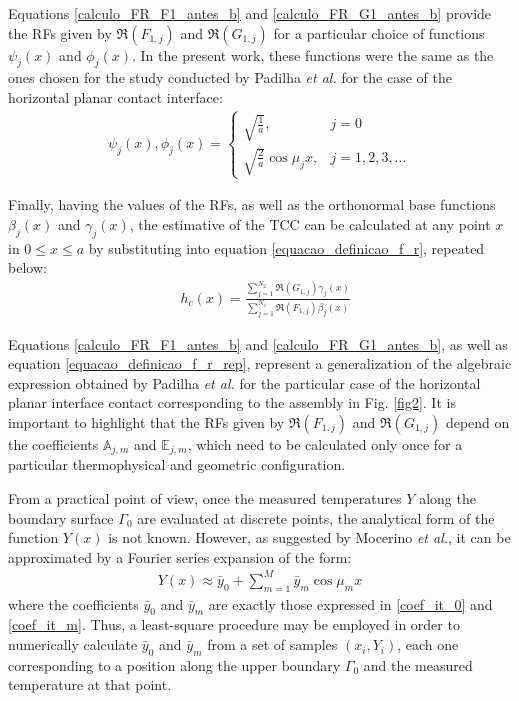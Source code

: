 \documentclass[conference,compsoc,fleqn]{IEEEtran}
\begin{document}
Equations \eqref{calculo_FR_F1_antes_b} and \eqref{calculo_FR_G1_antes_b} provide the RFs given by $\Re(F_{1,j})$ and $\Re(G_{1,j})$ for a particular choice of functions $\psi_j(x)$ and $\phi_j(x)$. In the present work, these functions were the same as the ones chosen for the study conducted by Padilha \textit{et al.}\cite{artigo_padilha_3} for the case of the horizontal planar contact interface:
\begin{align}
\psi_j(x), \phi_j(x) = \left\lbrace
\begin{array}{ll}
\sqrt{\frac{1}{a}}, & j = 0 \\ 
\sqrt{\frac{2}{a}}\cos \mu_j x, & j = 1,2,3,\ldots
\end{array}
\right.
\end{align} 

Finally, having the values of the RFs, as well as the orthonormal base functions $\beta_j(x)$ and $\gamma_j(x)$, the estimative of the TCC can be calculated at any point $x$ in $0 \le x \le a$ by substituting into equation \eqref{equacao_definicao_f_r}, repeated below:
\begin{align}
& h_c(x) %
= \frac{\displaystyle\sum_{j=1}^{N_2} \Re(G_{1,j}) \gamma_j(x)}{\displaystyle\sum_{j=1}^{N_1} \Re(F_{1,j}) \beta_j(x)}
\label{equacao_definicao_f_r_rep}
\end{align}

Equations \eqref{calculo_FR_F1_antes_b} and \eqref{calculo_FR_G1_antes_b}, as well as equation \eqref{equacao_definicao_f_r_rep}, represent a generalization of the algebraic expression obtained by Padilha \textit{et al.}\cite{artigo_padilha_3} for the particular case of the horizontal planar interface contact corresponding to the assembly in Fig. \ref{fig2}. It is important to highlight that the RFs given by $\Re(F_{1,j})$ and $\Re(G_{1,j})$ depend on the coefficients $\mathbb{A}_{j,m}$ and $\mathbb{E}_{j,m}$, which need to be calculated only once for a particular thermophysical and geometric configuration.

From a practical point of view, once the measured temperatures $Y$ along the boundary surface $\Gamma_0$ are evaluated at discrete points, the analytical form of the function $Y(x)$ is not known. However, as suggested by Mocerino \textit{et al.}\cite{artigo_mocerino}, it can be approximated by a Fourier series expansion of the form:
\begin{align}
Y(x) \approx \bar{y}_0 + \sum_{m=1}^M \bar{y}_m \cos\mu_m x \label{aproximacao_Y}
\end{align}
where the coefficients $\bar{y}_0$ and $\bar{y}_m$ are exactly those expressed in \eqref{coef_it_0} and \eqref{coef_it_m}. Thus, a least-square procedure may be employed in order to numerically calculate $\bar{y}_0$ and $\bar{y}_m$ from a set of samples $(x_i, Y_i)$, each one corresponding to a position along the upper boundary $\Gamma_0$ and the measured temperature at that point.
\\
\end{document}
